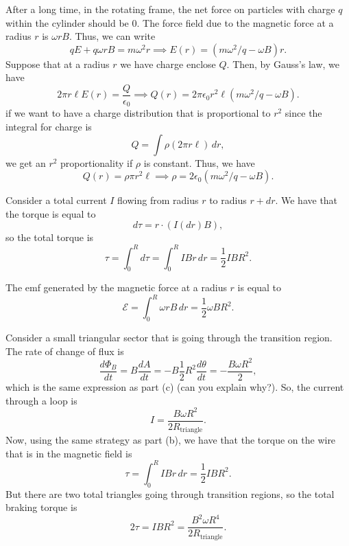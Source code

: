 \documentclass[11pt]{scrartcl}
\begin{document}
\begin{alphasol}
    \item After a long time, in the rotating frame, the net force on particles with charge $q$ within the cylinder should be 0. The force field due to the magnetic force at a radius $r$ is $\omega r B$. Thus, we can write
    $$qE + q\omega r B = m \omega^2 r \implies E(r) = (m\omega^2/q - \omega B) r.$$
    Suppose that at a radius $r$ we have charge enclose $Q$. Then, by Gauss's law, we have
    $$2\pi r \ell E(r) = \frac{Q}{\epsilon_0} \implies Q(r) = 2\pi\epsilon_0 r^2 \ell  (m \omega ^2/q - \omega B) .$$
    if we want to have a charge distribution that is proportional to $r^2$ since the integral for charge is
    $$Q = \int \rho (2\pi r\ell)\, dr,$$
    we get an $r^2$ proportionality if $\rho$ is constant. Thus, we have
    $$Q(r) = \rho \pi r^2 \ell \implies \rho = 2\epsilon_0 (m\omega^2/q - \omega B).$$
    \item Consider a total current $I$ flowing from radius $r$ to radius $r + dr$. We have that the torque is equal to
    $$d\tau = r\cdot (I (dr) B),$$
    so the total torque is
    $$\tau = \int_0^R d\tau = \int_0^R IB r\, dr =\boxed{ \frac 12 IBR^2}.$$
    \item The emf generated by the magnetic force at a radius $r$ is equal to
    $$\mathcal E = \int_0^R \omega r B\, dr = \frac 12 \omega BR^2. $$
    \item Consider a small triangular sector that is going through the transition region. The rate of change of flux is
    $$\frac{d\Phi_B}{dt} = B \frac{dA}{dt} = -B \frac 12 R^2 \frac{d\theta}{dt} = -\frac{B\omega R^2}{2},$$
    which is the same expression as part (c) (can you explain why?). So, the current through a loop is
    $$I = \frac{B\omega R^2}{2R_{\text{triangle}}}.$$
    Now, using the same strategy as part (b), we have that the torque on the wire that is in the magnetic field is
    $$\tau = \int_0^R IB r \, dr = \frac 12 IBR^2.$$
    But there are two total triangles going through transition regions, so the total braking torque is
    $$2 \tau = IBR^2 = \frac{B^2 \omega R^4}{2R_{\text{triangle}}}.$$
\end{alphasol}
\end{document}

